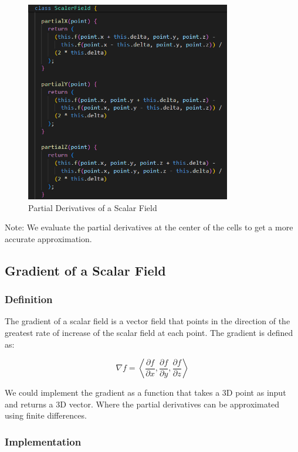 \documentclass[12pt]{article}
\begin{document}
\begin{figure}[H]
    \centering
    \includegraphics[width=0.8\textwidth]{images/partial.png}
    \caption{Partial Derivatives of a Scalar Field\cite{El-Deeb_PEU-218_Stokes_Threejs}}
\end{figure}

Note: We evaluate the partial derivatives at the center of the cells to get a more accurate approximation.

\subsection{Gradient of a Scalar Field}

\subsubsection{Definition}

The gradient of a scalar field is a vector field that points in the direction of the greatest rate of increase of the scalar field at each point. The gradient is defined as:

\[
    \nabla f = \left\langle \frac{\partial f}{\partial x}, \frac{\partial f}{\partial y}, \frac{\partial f}{\partial z}\right\rangle
\]

We could implement the gradient as a function that takes a 3D point as input and returns a 3D vector.
Where the partial derivatives can be approximated using finite differences.

\subsubsection{Implementation}
\end{document}

